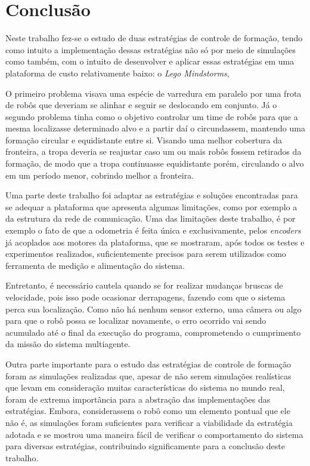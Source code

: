 \chapter{Conclusão}
\label{chap:conclusao}

Neste trabalho fez-se o estudo de duas estratégias de controle de formação, tendo como intuito a implementação dessas estratégias não só por meio de simulações como também, com o intuito de desenvolver e aplicar essas estratégias em uma plataforma de custo relativamente baixo: o \emph{Lego Mindstorms\textregistered},  

O primeiro problema visava uma espécie de varredura em paralelo por uma frota de robôs que deveriam se alinhar e seguir se deslocando em conjunto. Já o segundo problema tinha como o objetivo controlar um time de robôs para que a mesma localizasse determinado alvo e a partir daí o circundassem, mantendo uma formação circular e equidistante entre si. Visando uma melhor cobertura da fronteira, a tropa deveria se reajustar caso um ou mais robôs fossem retirados da formação, de modo que a tropa continuasse equidistante porém, circulando o alvo em um período menor, cobrindo melhor a fronteira.

Uma parte deste trabalho foi adaptar as estratégias e soluções encontradas para se adequar a plataforma que apresenta algumas limitações, como por exemplo a da estrutura da rede de comunicação. Uma das limitações deste trabalho, é por exemplo o fato de que a odometria é feita única e exclusivamente, pelos \emph{encoders} já acoplados aos motores da plataforma, que se mostraram, após todos os testes e experimentos realizados, suficientemente precisos para serem utilizados como ferramenta de medição e alimentação do sistema. 

Entretanto, é necessário cautela quando se for realizar mudanças bruscas de velocidade, pois isso pode ocasionar derrapagens, fazendo com que o sistema perca sua localização. Como não há nenhum %
sensor externo, uma câmera ou algo para que o robô possa se localizar novamente, o erro ocorrido vai sendo acumulado até o final da execução do programa, comprometendo o cumprimento da missão do sistema multiagente.%

Outra parte importante para o estudo das estratégias de controle de formação foram as simulações realizadas que, apesar de não serem simulações realísticas que levam em consideração muitas características do sistema no mundo real, foram de extrema importância para a abstração das implementações das estratégias. Embora, considerassem o robô como um elemento pontual que ele não é, as simulações foram suficientes para verificar a viabilidade da estratégia adotada e se mostrou uma maneira fácil de verificar o comportamento do sistema para diversas estratégias, contribuindo significamente para a conclusão deste trabalho.


